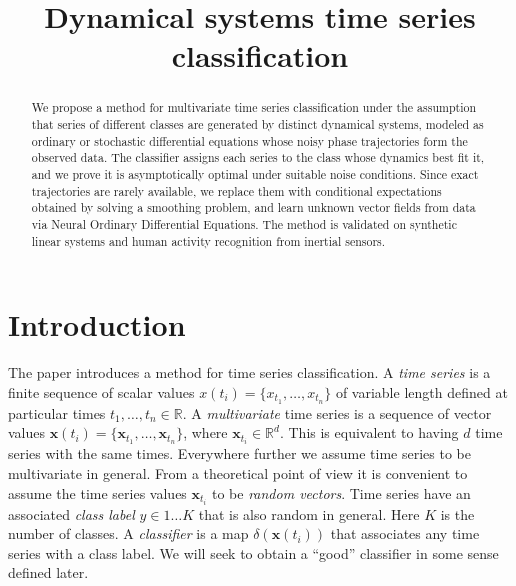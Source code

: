 \documentclass[referee, pdflatex, sn-mathphys-num]{sn-jnl}
\theoremstyle{definition}
\theoremstyle{plain}
\newcommand{\bx}{\ensuremath{\mathbf{x}}}
\begin{document}
	
	\title{Dynamical systems time series classification}
	
	\author*[1]{ }
	\author*[2]{ }
	
	
	
	\maketitle
	
	\begin{abstract}
		
		We propose a method for multivariate time series classification under the assumption that series of different classes are generated by distinct dynamical systems, modeled as ordinary or stochastic differential equations whose noisy phase trajectories form the observed data. The classifier assigns each series to the class whose dynamics best fit it, and we prove it is asymptotically optimal under suitable noise conditions. Since exact trajectories are rarely available, we replace them with conditional expectations obtained by solving a smoothing problem, and learn unknown vector fields from data via Neural Ordinary Differential Equations. The method is validated on synthetic linear systems and human activity recognition from inertial sensors.
		
	\end{abstract}
	
	\section{Introduction}\label{Intro}
	
	The paper introduces a method for time series classification. A \emph{time series} is a finite sequence of scalar values $x(t_i)= \{ x_{t_1}, \ldots, x_{t_n} \}$ of variable length defined at particular times $t_1, \ldots, t_n \in \mathbb{R}$. A \emph{multivariate} time series is a sequence of vector values $\bx(t_i)= \{\bx_{t_1}, \ldots, \bx_{t_n}\}$, where $\bx_{t_i} \in \mathbb{R}^d$. This is equivalent to having $d$ time series with the same times. Everywhere further we assume time series to be multivariate in general. From a theoretical point of view it is convenient to assume the time series values $\bx_{t_i}$ to be \emph{random vectors}. Time series have an associated \emph{class label} $y \in 1 \ldots K$ that is also random in general. Here $K$ is the number of classes. A \emph{classifier} is a map $\delta(\bx(t_i))$ that associates any time series with a class label. We will seek to obtain a ``good'' classifier in some sense defined later.
	
\end{document}

